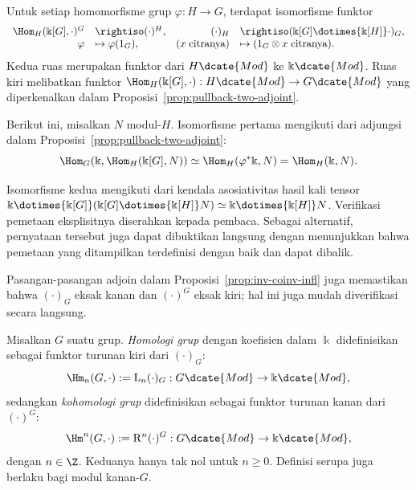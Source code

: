 \begin{korolari}\label{prop:Ind-invariant}
	Untuk setiap homomorfisme grup $\varphi:H\to G$, terdapat isomorfisme funktor
	\[\begin{array}{rlrl}
		\Hom_H(\Bbbk[G], \cdot)^G & \rightiso (\cdot)^H, & (\cdot)_H & \rightiso (\Bbbk[G] \dotimes{\Bbbk[H]} \cdot)_G , \\
		\varphi & \mapsto \varphi(1_G), & (x \;\text{citranya}) & \mapsto (1_G \otimes x \;\text{citranya}) .
	\end{array}\]
	Kedua ruas merupakan funktor dari $H\dcate{Mod}$ ke
	$\Bbbk\dcate{Mod}$. Ruas kiri melibatkan funktor
	$\Hom_H(\Bbbk[G],\cdot):H\dcate{Mod}\to G\dcate{Mod}$ yang diperkenalkan
	dalam Proposisi~\ref{prop:pullback-two-adjoint}.
\end{korolari}
\begin{bukti}
	Berikut ini, misalkan $N$ modul-$H$. Isomorfisme pertama mengikuti dari
	adjungsi dalam Proposisi~\ref{prop:pullback-two-adjoint}:
	\[ \Hom_G(\Bbbk, \Hom_H(\Bbbk[G], N)) \simeq \Hom_H(\varphi^* \Bbbk, N) = \Hom_H(\Bbbk, N). \]
	
	Isomorfisme kedua mengikuti dari kendala asosiativitas hasil kali tensor
	$\Bbbk\dotimes{\Bbbk[G]}(\Bbbk[G]\dotimes{\Bbbk[H]}N)
	\simeq\Bbbk\dotimes{\Bbbk[H]}N$. Verifikasi pemetaan eksplisitnya
	diserahkan kepada pembaca. Sebagai alternatif, pernyataan tersebut juga
	dapat dibuktikan langsung dengan menunjukkan bahwa pemetaan yang
	ditampilkan terdefinisi dengan baik dan dapat dibalik.
\end{bukti}

Pasangan-pasangan adjoin dalam Proposisi~\ref{prop:inv-coinv-infl} juga
memastikan bahwa $(\cdot)_G$ eksak kanan dan $(\cdot)^G$ eksak kiri; hal ini
juga mudah diverifikasi secara langsung.

\begin{definisi}\label{def:group-coh-ho}
	Misalkan $G$ suatu grup. \emph{Homologi grup} dengan koefisien dalam $\Bbbk$
	didefinisikan sebagai funktor turunan kiri dari $(\cdot)_G$:
	\[ \Hm_n(G, \cdot) := \mathrm{L}_n (\cdot)_G: G\dcate{Mod} \to \Bbbk\dcate{Mod}, \]
	sedangkan \emph{kohomologi grup} didefinisikan sebagai funktor turunan
	kanan dari $(\cdot)^G$:
	\[ \Hm^n(G, \cdot) := \mathrm{R}^n (\cdot)^G: G\dcate{Mod} \to \Bbbk\dcate{Mod}, \]
	dengan $n\in\Z$. Keduanya hanya tak nol untuk $n\geq0$. Definisi serupa
	juga berlaku bagi modul kanan-$G$.
\end{definisi}

